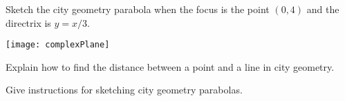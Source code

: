 \documentclass[nooutcomes]{ximera}
\begin{document}
\newpage

\begin{problem}
Sketch the city geometry parabola when the focus is the point $(0,4)$
and the directrix is $y=x/3$.
\begin{image}
\texttt{[image: complexPlane]}
\end{image}
\vfill
\end{problem}

\newpage


\begin{problem}
Explain how to find the distance between a point and a line in city
geometry.
\vfill
\end{problem}


\begin{problem}
Give instructions for sketching city geometry parabolas.
\vfill
\end{problem}
\end{document}
